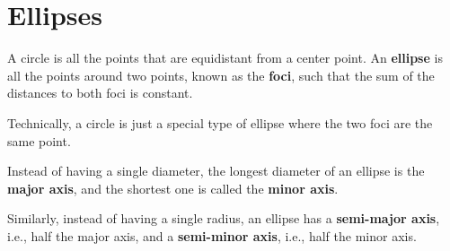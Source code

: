 \documentclass[a4paper, titlepage]{book}
\begin{document}
\frontmatter

\tableofcontents \label{contents}

\mainmatter









\appendix



\chapter{Ellipses} \label{chap:ellipses}

A circle is all the points that are equidistant from a center point.
An \textbf{ellipse} is all the points around two points,
known as the \textbf{foci},
such that the sum of the distances to both foci is constant.

Technically, a circle is just a special type of ellipse
where the two foci are the same point.

Instead of having a single diameter,
the longest diameter of an ellipse is the \textbf{major axis},
and the shortest one is called the \textbf{minor axis}.

Similarly, instead of having a single radius,
an ellipse has a \textbf{semi-major axis}, i.e., half the major axis,
and a \textbf{semi-minor axis}, i.e., half the minor axis.

\backmatter

\printbibliography[
    heading=bibintoc,
    title={References},
]
\end{document}
